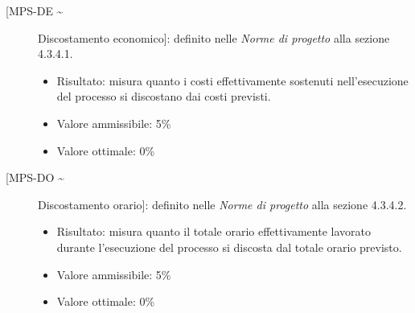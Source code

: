 \documentclass[../piano-di-qualifica.tex]{subfiles}
\begin{document}
\begin{description}
  \item [[MPS-DE \textasciitilde] Discostamento economico]: definito nelle \textit{Norme di progetto} alla sezione 4.3.4.1.
  \begin{itemize} \item Risultato: misura quanto i costi effettivamente sostenuti nell’esecuzione del
  processo si discostano dai costi previsti. \item Valore ammissibile: 5\% \item Valore ottimale: 0\% \end{itemize}

  \item [[MPS-DO \textasciitilde] Discostamento orario]: definito nelle \textit{Norme di progetto} alla sezione 4.3.4.2.
  \begin{itemize} \item Risultato: misura quanto il totale orario effettivamente lavorato durante l’esecuzione
  del processo si discosta dal totale orario previsto. \item Valore ammissibile: 5\% \item Valore ottimale: 0\% \end{itemize}
\end{description}






\end{document}
